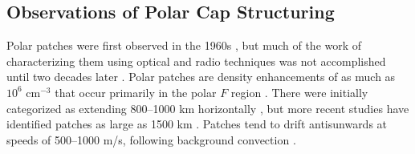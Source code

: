 



\subsection{Observations of Polar Cap Structuring}
\label{sec:lit_observations}
Polar patches were first observed in the 1960s \citep{Hill1963}, but much of the work of characterizing them using optical and radio techniques was not accomplished until two decades later \citep{Weber1981,Weber1984,Weber1986,Buchau1983,Buchau1985}.  Polar patches are density enhancements of as much as \(10^6\) cm\(^{-3}\) that occur primarily in the polar \(F\) region \citep{Buchau1983}.  There were initially categorized as extending 800--1000 km horizontally \citep{Weber1984}, but more recent studies have identified patches as large as 1500 km \citep{Hosokawa2014}.  Patches tend to drift antisunwards at speeds of 500--1000 m/s, following background convection \citep{Buchau1983,Weber1984}.

